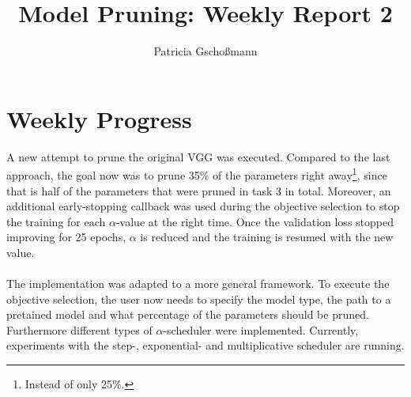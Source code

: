 \documentclass[10pt,twocolumn,letterpaper]{article}
\begin{document}
\title{Model Pruning: Weekly Report 2}
\author{Patricia Gschoßmann}

\maketitle

\section{Weekly Progress}
A new attempt to prune the original VGG was executed.
Compared to the last approach, the goal now was to prune 35\% of the parameters right away\footnote{Instead of only 25\%.}, since that is half of the parameters that were pruned in task 3 in total.
Moreover, an additional early-stopping callback was used during the objective selection to stop the training for each $\alpha$-value at the right time.
Once the validation loss stopped improving for 25 epochs, $\alpha$ is reduced and the training is resumed with the new value.\\\\
The implementation was adapted to a more general framework.
To execute the objective selection, the user now needs to specify the model type, the path to a pretained model and what percentage of the parameters should be pruned.\\
Furthermore different types of $\alpha$-scheduler were implemented.
Currently, experiments with the step-, exponential- and multiplicative scheduler are running.
\end{document}
